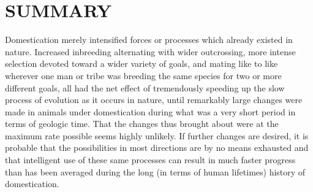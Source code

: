 \section*{SUMMARY}

Domestication merely intensified forces or processes which already existed in nature. Increased inbreeding alternating with 
wider outcrossing, more intense selection devoted toward a wider variety of goals, and mating like to like wherever one 
man or tribe was breeding the same species for two or more different goals, all had the net effect of tremendously speeding 
up the slow process of evolution as it occurs in nature, until remarkably large changes were made in animals under 
domestication during what was a very short period in terms of geologic time. That the changes thus brought about were at 
the maximum rate possible seems highly unlikely. If further changes are desired, it is probable that the possibilities in 
most directions are by no means exhausted and that intelligent use of these same processes can result in much faster 
progress than has been averaged during the long (in terms of human lifetimes) history of domestication.
